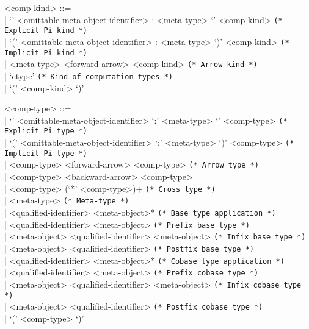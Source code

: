 \documentclass[11pt]{article}
\begin{document}
\begin{grammar}
<comp-kind> ::= \hfill\\
| `{' <omittable-meta-object-identifier> : <meta-type> `}' <comp-kind> \hfill \texttt{(* Explicit Pi kind *)}\\
| `(' <omittable-meta-object-identifier> : <meta-type> `)' <comp-kind> \hfill \texttt{(* Implicit Pi kind *)}\\
| <meta-type> <forward-arrow> <comp-kind> \hfill \texttt{(* Arrow kind *)}\\
| `ctype' \hfill \texttt{(* Kind of computation types *)}\\
| `(' <comp-kind> `)'

<comp-type> ::= \hfill\\
| `{' <omittable-meta-object-identifier> `:' <meta-type> `}' <comp-type> \hfill \texttt{(* Explicit Pi type *)}\\
| `(' <omittable-meta-object-identifier> `:' <meta-type> `)' <comp-type> \hfill \texttt{(* Implicit Pi type *)}\\
| <comp-type> <forward-arrow> <comp-type> \hfill \texttt{(* Arrow type *)}\\
| <comp-type> <backward-arrow> <comp-type>\\
| <comp-type> (`*' <comp-type>)+ \hfill \texttt{(* Cross type *)}\\
| <meta-type> \hfill \texttt{(* Meta-type *)}\\
| <qualified-identifier> <meta-object>* \hfill \texttt{(* Base type application *)}\\
| <qualified-identifier> <meta-object> \hfill \texttt{(* Prefix base type *)}\\
| <meta-object> <qualified-identifier> <meta-object> \hfill \texttt{(* Infix base type *)}\\
| <meta-object> <qualified-identifier> \hfill \texttt{(* Postfix base type *)}\\
| <qualified-identifier> <meta-object>* \hfill \texttt{(* Cobase type application *)}\\
| <qualified-identifier> <meta-object> \hfill \texttt{(* Prefix cobase type *)}\\
| <meta-object> <qualified-identifier> <meta-object> \hfill \texttt{(* Infix cobase type *)}\\
| <meta-object> <qualified-identifier> \hfill \texttt{(* Postfix cobase type *)}\\
| `(' <comp-type> `)'


\end{grammar}
\end{document}
